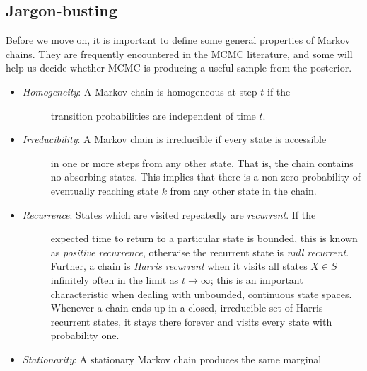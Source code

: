 \documentclass[letterpaper,10pt,english]{sphinxmanual}
\begin{document}
\subsection{Jargon-busting}
\label{theory:jargon-busting}
Before we move on, it is important to define some general properties of Markov chains. They are frequently encountered in the MCMC literature, and some will help us decide whether MCMC is producing a useful sample from the posterior.
\begin{itemize}
\item {} \begin{description}
\item[{\emph{Homogeneity}: A Markov chain is homogeneous at step $t$ if the}] \leavevmode
transition probabilities are independent of time $t$.

\end{description}

\item {} \begin{description}
\item[{\emph{Irreducibility}: A Markov chain is irreducible if every state is accessible}] \leavevmode
in one or more steps from any other state. That is, the chain contains no
absorbing states. This implies that there is a non-zero probability of
eventually reaching state $k$ from any other state in the chain.

\end{description}

\item {} \begin{description}
\item[{\emph{Recurrence}: States which are visited repeatedly are \emph{recurrent}. If the}] \leavevmode
expected time to return to a particular state is bounded, this is known as
\emph{positive recurrence}, otherwise the recurrent state is \emph{null recurrent}.
Further, a chain is \emph{Harris recurrent} when it visits all states $X
\in S$ infinitely often in the limit as $t \to \infty$; this is an
important characteristic when dealing with unbounded, continuous state
spaces. Whenever a chain ends up in a closed, irreducible set of Harris
recurrent states, it stays there forever and visits every state with
probability one.

\end{description}

\item {} \begin{description}
\item[{\emph{Stationarity}: A stationary Markov chain produces the same marginal}] \leavevmode\begin{quote}


\end{quote}
\end{description}
\end{itemize}
\end{document}

